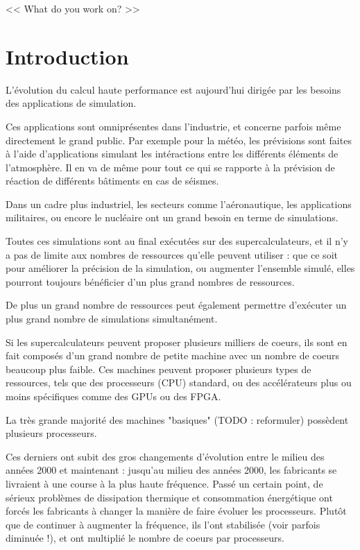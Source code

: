 \begin{savequote}[6cm]
<< What do you work on?  >>
\end{savequote}
\chapter{Introduction}
\chaptertoc

L'évolution du calcul haute performance est aujourd'hui dirigée par les besoins des applications de simulation.

Ces applications sont omniprésentes dans l'industrie, et concerne parfois même directement le grand public.
Par exemple pour la météo, les prévisions sont faites à l'aide d'applications simulant les intéractions entre les différents éléments de l'atmosphère.
Il en va de même pour tout ce qui se rapporte à la prévision de réaction de différents bâtiments en cas de séismes.

Dans un cadre plus industriel, les secteurs comme l'aéronautique, les applications militaires, ou encore le nucléaire ont un grand besoin en terme de simulations.

Toutes ces simulations sont au final exécutées sur des supercalculateurs, et il n'y a pas de limite aux nombres de ressources qu'elle peuvent utiliser : que ce soit pour améliorer la précision de la simulation, ou augmenter l'ensemble simulé, elles pourront toujours bénéficier d'un plus grand nombres de ressources.

De plus un grand nombre de ressources peut également permettre d'exécuter un plus grand nombre de simulations simultanément.

Si les supercalculateurs peuvent proposer plusieurs milliers de coeurs, ils sont en fait composés d'un grand nombre de petite machine avec un nombre de coeurs beaucoup plus faible.
Ces machines peuvent proposer plusieurs types de ressources, tels que des processeurs (CPU) standard, ou des accélérateurs plus ou moins spécifiques comme des GPUs ou des FPGA.

La très grande majorité des machines "basiques" (TODO : reformuler) possèdent plusieurs processeurs.

Ces derniers ont subit des gros changements d'évolution entre le milieu des années 2000 et maintenant : jusqu'au milieu des années 2000, les fabricants se livraient à une course à la plus haute fréquence.
Passé un certain point, de sérieux problèmes de dissipation thermique et consommation énergétique ont forcés les fabricants à changer la manière de faire évoluer les processeurs. Plutôt que de continuer à augmenter la fréquence, ils l'ont stabilisée (voir parfois diminuée !), et ont multiplié le nombre de coeurs par processeurs.



